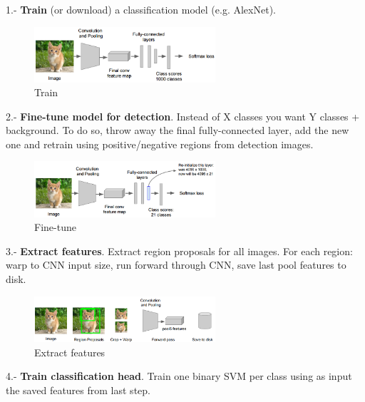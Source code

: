 1.- \textbf{Train} (or download) a classification model (e.g. AlexNet).
\begin{figure}[h]
  \centering
  \includegraphics[width=0.6\textwidth]{Images/region_based_cnn/2.png}
  \caption{Train}
\end{figure}
2.- \textbf{Fine-tune model for detection}. Instead of X classes you want Y classes + background. To do so, throw away the final fully-connected layer, add the new one and retrain using positive/negative regions from detection images.
\begin{figure}[h]
  \centering
  \includegraphics[width=0.6\textwidth]{Images/region_based_cnn/3.png}
  \caption{Fine-tune}
\end{figure}
3.- \textbf{Extract features}. Extract region proposals for all images. For each region: warp to CNN input size, run forward through CNN, save last pool features to disk.
\begin{figure}[h]
  \centering
  \includegraphics[width=0.6\textwidth]{Images/region_based_cnn/4.png}
  \caption{Extract features}
\end{figure}
4.- \textbf{Train classification head}. Train one binary SVM per class using as input the saved features from last step.

